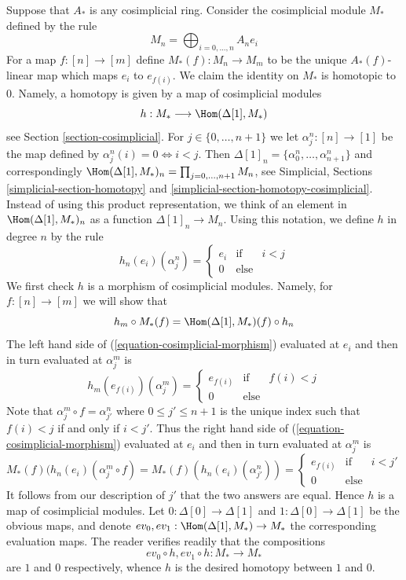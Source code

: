 \begin{example}
\label{example-cosimplicial-module}
Suppose that $A_*$ is any cosimplicial ring.
Consider the cosimplicial module $M_*$ defined by the rule
$$
M_n = \bigoplus\nolimits_{i = 0, ..., n} A_n e_i
$$
For a map $f : [n] \to [m]$ define $M_*(f) : M_n \to M_m$
to be the unique $A_*(f)$-linear map which maps $e_i$ to $e_{f(i)}$.
We claim the identity on $M_*$ is homotopic to $0$.
Namely, a homotopy is given by a map of cosimplicial modules
$$
h : M_* \longrightarrow \Hom(\Delta[1], M_*)
$$
see Section \ref{section-cosimplicial}.
For $j \in \{0, \ldots, n + 1\}$ we let $\alpha^n_j : [n] \to [1]$ be the map
defined by $\alpha^n_j(i) = 0 \Leftrightarrow i < j$. Then
$\Delta[1]_n = \{\alpha^n_0, \ldots, \alpha^n_{n + 1}\}$ and correspondingly
$\Hom(\Delta[1], M_*)_n = \prod_{j = 0, \ldots, n + 1} M_n$, see
Simplicial, Sections \ref{simplicial-section-homotopy} and
\ref{simplicial-section-homotopy-cosimplicial}. Instead of using
this product representation, we think of an element
in $\Hom(\Delta[1], M_*)_n$ as a function $\Delta[1]_n \to M_n$.
Using this notation, we define $h$ in degree $n$ by the rule
$$
h_n(e_i)(\alpha^n_j) =
\left\{
\begin{matrix}
e_{i} & \text{if} & i < j \\
0 & \text{else} 
\end{matrix}
\right.
$$
We first check $h$ is a morphism of cosimplicial modules. Namely, for
$f : [n] \to [m]$ we will show that
\begin{equation}
\label{equation-cosimplicial-morphism}
h_m \circ M_*(f) = \Hom(\Delta[1], M_*)(f) \circ h_n
\end{equation}
The left hand side of (\ref{equation-cosimplicial-morphism}) evaluated at
$e_i$ and then in turn evaluated at $\alpha^m_j$ is
$$
h_m(e_{f(i)})(\alpha^m_j) =
\left\{
\begin{matrix}
e_{f(i)} & \text{if} & f(i) < j \\
0 & \text{else}
\end{matrix}
\right.
$$
Note that $\alpha^m_j \circ f = \alpha^n_{j'}$ where
$0 \leq j' \leq n + 1$ is the unique index such that $f(i) < j$
if and only if $i < j'$. Thus the right hand side of
(\ref{equation-cosimplicial-morphism}) evaluated at $e_i$
and then in turn evaluated at $\alpha^m_j$ is
$$
M_*(f)(h_n(e_i)(\alpha^m_j \circ f) =
M_*(f)(h_n(e_i)(\alpha^n_{j'})) =
\left\{
\begin{matrix}
e_{f(i)} & \text{if} & i < j' \\
0 & \text{else} 
\end{matrix}
\right.
$$
It follows from our description of $j'$ that the two answers are equal.
Hence $h$ is a map of cosimplicial modules.
Let $0 : \Delta[0] \to \Delta[1]$ and
$1 : \Delta[0] \to \Delta[1]$ be the obvious maps, and denote
$ev_0, ev_1 : \Hom(\Delta[1], M_*) \to M_*$ the corresponding
evaluation maps. The reader verifies readily that
the compositions
$$
ev_0 \circ h, ev_1 \circ h : M_* \longrightarrow M_*
$$
are $1$ and $0$ respectively, whence $h$ is the desired homotopy between
$1$ and $0$.
\end{example}

